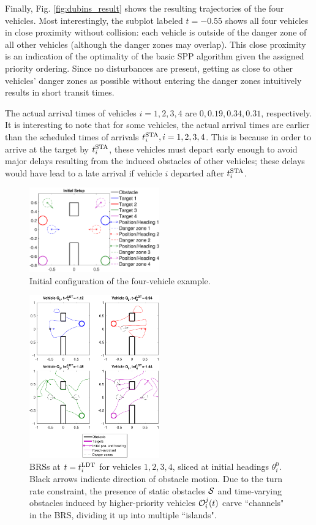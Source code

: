 Finally, Fig. \ref{fig:dubins_result} shows the resulting trajectories of the four vehicles. Most interestingly, the subplot labeled $t=-0.55$ shows all four vehicles in close proximity without collision: each vehicle is outside of the danger zone of all other vehicles (although the danger zones may overlap). This close proximity is an indication of the optimality of the basic SPP algorithm given the assigned priority ordering. Since no disturbances are present, getting as close to other vehicles' danger zones as possible without entering the danger zones intuitively results in short transit times.

The actual arrival times of vehicles $i=1,2,3,4$ are $0, 0.19, 0.34, 0.31$, respectively. It is interesting to note that for some vehicles, the actual arrival times are earlier than the scheduled times of arrivals $t^\text{STA}_i, i=1,2,3,4$. This is because in order to arrive at the target by $t^\text{STA}_i$, these vehicles must depart early enough to avoid major delays resulting from the induced obstacles of other vehicles; these delays would have lead to a late arrival if vehicle $i$ departed after $t^\text{STA}_i$.

\begin{figure}
	\centering
	\includegraphics[width=0.5\textwidth]{"fig/dubins_ic"}
	\caption{Initial configuration of the four-vehicle example.}
	\label{fig:dubins_ic}
\end{figure}

\begin{figure}
	\centering
	\includegraphics[width=0.5\textwidth]{"fig/dubins_reach_all"}
	\caption{BRSs at $t=t^\text{LDT}_i$ for vehicles $1,2,3,4$, sliced at initial headings $\theta_i^0$. Black arrows indicate direction of obstacle motion. Due to the turn rate constraint, the presence of static obstacles $\mathcal{S}$ and time-varying obstacles induced by higher-priority vehicles $\mathcal{O}_i^j(t)$ carve ``channels" in the BRS, dividing it up into multiple ``islands".}
	\label{fig:dubins_reach_all}
\end{figure}

